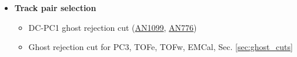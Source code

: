 \begin{description}
\begin{itemize}
					EMCal:
					\begin{itemize}
                  \item EMCal fiducial cuts: 2D cuts in $Y_{\text{tower}} - Z_{\text{tower}}$ space (Figures \ref{fig:dm_emcale0} - \ref{fig:dm_emcalw3})
                  \item $E_{core}$ cut: $E_{\text{core}} > 0.25$ for PbSc, $E_{\text{core}} > 0.35$ for PbGl, Sec. \ref{sec:emcal_ecore_cut} (similar to \href{https://phenix-intra.sdcc.bnl.gov/phenix/WWW/p/info/an/375/}{AN375})
					\end{itemize}

            \item \textbf{Track pair selection}
					\begin{itemize}
                  \item DC-PC1 ghost rejection cut (\href{https://phenix-intra.sdcc.bnl.gov/phenix/WWW/p/draft/nihashi/main.pdf}{AN1099}, \href{https://phenix-intra.sdcc.bnl.gov/phenix/WWW/p/draft/chujo/PPG101/AN_pp_paper/draft_AN.pdf}{AN776})
                  \item Ghost rejection cut for PC3, TOFe, TOFw, EMCal, Sec. \ref{sec:ghost_cuts}
					\end{itemize}
			\end{itemize}
	\end{description}
